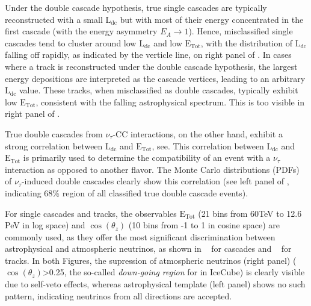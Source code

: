 Under the double cascade hypothesis, true single cascades are typically reconstructed with a small $\mathrm{L}_{\mathrm{dc}}$ but with most of their energy concentrated in the first cascade (with the energy asymmetry $E_A \rightarrow 1$). Hence, misclassified single cascades tend to cluster around low $\mathrm{L}_{\mathrm{dc}}$ and low $\mathrm{E}_{\mathrm{Tot}}$, with the distribution of $\mathrm{L}_{\mathrm{dc}}$ falling off rapidly, as indicated by the verticle line, on right panel of . In cases where a track is reconstructed under the double cascade hypothesis, the largest energy depositions are interpreted as the cascade vertices, leading to an arbitrary $\mathrm{L}_{\mathrm{dc}}$ value. These tracks, when misclassified as double cascades, typically exhibit low $\mathrm{E}_{\mathrm{Tot}}$, consistent with the falling astrophysical spectrum. This is too visible in right panel of .

True double cascades from $\nu_\tau$-CC interactions, on the other hand, exhibit a strong correlation between $\mathrm{L}_{\mathrm{dc}}$ and $\mathrm{E}_{\mathrm{Tot}}$, see. This correlation between $\mathrm{L}_{\mathrm{dc}}$ and $\mathrm{E}_{\mathrm{Tot}}$ is primarily used to determine the compatibility of an event with a $\nu_\tau$ interaction as opposed to another flavor. The Monte Carlo distributions (PDFs) of $\nu_\tau$-induced double cascades clearly show this correlation (see left panel of , indicating 68\% region of all classified true double cascade events). 

For single cascades and tracks, the observables $\mathrm{E}_{\mathrm{Tot}}$ (21 bins from 60TeV to 12.6 PeV in log space) and $\cos(\theta_z)$ (10 bins from -1 to 1 in cosine space) are commonly used, as they offer the most significant discrimination between astrophysical and atmospheric neutrinos, as shown in ~ for cascades and ~ for tracks. In both Figures, the supression of atmospheric neutrinos (right panel) ($\cos(\theta_z)$>0.25, the so-called \emph{down-going region} for in IceCube) is clearly visible due to self-veto effects, whereas astrophysical template (left panel) shows no such pattern, indicating neutrinos from all directions are accepted. 

